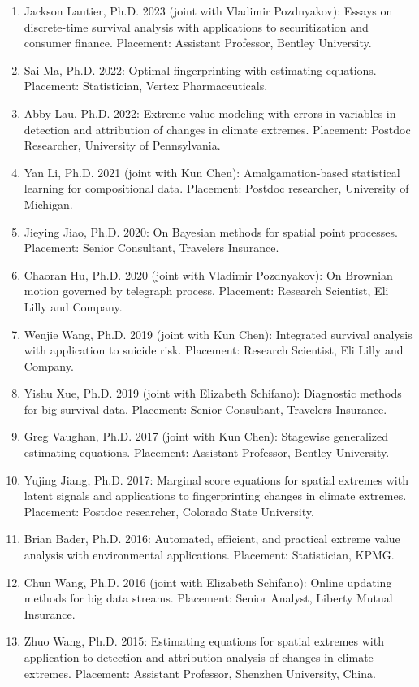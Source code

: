 \documentclass[Statistics]{vita}
\begin{document}
\begin{vita}
\begin{enumerate}
    \item Jackson Lautier, Ph.D. 2023 (joint with Vladimir Pozdnyakov): Essays on discrete-time survival analysis with applications to securitization and consumer finance. Placement: Assistant Professor, Bentley University. 
    \item Sai Ma, Ph.D. 2022: Optimal fingerprinting with estimating equations. Placement: Statistician, Vertex Pharmaceuticals.
    \item Abby Lau, Ph.D. 2022: Extreme value modeling with errors-in-variables in detection and attribution of changes in climate extremes. Placement: Postdoc Researcher, University of Pennsylvania.
    \item Yan Li, Ph.D. 2021 (joint with Kun Chen): Amalgamation-based statistical learning for compositional data. Placement: Postdoc researcher, University of Michigan.
    \item Jieying Jiao, Ph.D. 2020: On Bayesian methods for spatial point processes. Placement: Senior Consultant, Travelers Insurance.
    \item Chaoran Hu, Ph.D. 2020 (joint with Vladimir Pozdnyakov): On Brownian motion governed by telegraph process. Placement: Research Scientist, Eli Lilly and Company.
    \item Wenjie Wang, Ph.D. 2019 (joint with Kun Chen): Integrated survival analysis with application to suicide risk. Placement: Research Scientist, Eli Lilly and Company.
    \item Yishu Xue, Ph.D. 2019 (joint with Elizabeth Schifano): Diagnostic methods for big survival data. Placement: Senior Consultant, Travelers Insurance.
    \item Greg Vaughan, Ph.D. 2017 (joint with Kun Chen): Stagewise generalized estimating equations. Placement: Assistant Professor, Bentley University.
    \item Yujing Jiang, Ph.D. 2017: Marginal score equations for spatial extremes with latent signals and applications to fingerprinting changes in climate extremes. Placement: Postdoc researcher, Colorado State University.
    \item Brian Bader, Ph.D. 2016: Automated, efficient, and practical extreme value analysis with environmental applications. Placement: Statistician, KPMG.
    \item Chun Wang, Ph.D. 2016 (joint with Elizabeth Schifano): Online updating methods for big data streams. Placement: Senior Analyst, Liberty Mutual Insurance.
    \item Zhuo Wang, Ph.D. 2015: Estimating equations for spatial extremes with application to detection and attribution analysis of changes in climate extremes. Placement: Assistant Professor, Shenzhen University, China.

\end{enumerate}
\end{vita}
\end{document}
